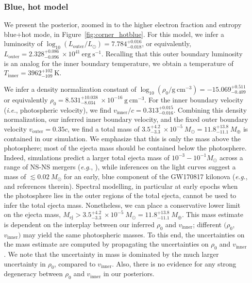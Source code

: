 \documentclass[twocolumn, twocolappendix]{aastex63}
\def\eg{{\it e.g.}}
\def\ie{{\it i.e.}}
\begin{document}
\subsubsection{Blue, hot model}\label{sssc:bluehot}

We present the posterior, zoomed in to the higher electron fraction and entropy blue+hot mode, in Figure~\ref{fig:corner_hotblue}. For this model, we infer a luminosity of $\log_{10}(L_\mathrm{outer}/L_{\odot}) = 7.784^{+0.016}_{-0.018}$, or equivalently, $L_{\mathrm{outer}} = 2.328^{+0.086}_{-0.096}~\times 10^{41}~\mathrm{erg~s^{-1}}$. Recalling that this outer boundary luminosity is an analog for the inner boundary temperature, we obtain a temperature of $T_{\mathrm{inner}} = 3962^{+102}_{-109}~\mathrm{K}$.  

We infer a density normalization constant of $\log_{10} (\rho_0 / \mathrm{g~cm^{-3}}) = -15.069^{+0.511}_{-0.409}$ or equivalently $\rho_0 = 8.531^{+10.038}_{-8.034}~\times 10^{-16}~\mathrm{g~cm^{-3}}$. For the inner boundary velocity (\ie, photospheric velocity), we find $v_{\mathrm{inner}}/c = 0.313^{+0.015}_{-0.016}$. Combining this density normalization, our inferred inner boundary velocity, and the fixed outer boundary velocity $v_{\mathrm{outer}} = 0.35c$, we find a total mass of $ 3.5^{+4.2}_{-3.3}~\times 10^{-5}~M_{\odot} = 11.8^{+13.8}_{-11.1}~M_{\oplus}$ is contained in our simulation. We emphasize that this is only the mass above the photosphere; most of the ejecta mass should be contained below the photosphere. Indeed, simulations predict a larger total ejecta mass of $10^{-3} - 10^{-1} M_{\odot}$ across a range of NS-NS mergers (\eg, \citealt{fernandez16, shibata19}), while inferences on the light curves suggest a mass of $\lesssim 0.02~M_{\odot}$ for an early, blue component of the GW170817 kilonova (\eg, \citealt{villar17} and references therein). Spectral modelling, in particular at early epochs when the photosphere lies in the outer regions of the total ejecta, cannot be used to infer the total ejecta mass. Nonetheless, we can place a conservative lower limit on the ejecta mass, $M_{\mathrm{ej}} > 3.5^{+4.2}_{-3.3}~\times 10^{-5}~M_{\odot} = 11.8^{+13.8}_{-11.1}~M_{\oplus}$. This mass estimate is dependent on the interplay between our inferred $\rho_0$ and $v_{\mathrm{inner}}$; different $(\rho_0$, $v_{\mathrm{inner}})$ may yield the same photospheric masses. To this end, the uncertainties on the mass estimate are computed by propagating the uncertainties on $\rho_0$ and $v_{\mathrm{inner}}$. We note that the uncertainty in mass is dominated by the much larger uncertainty in $\rho_0$, compared to $v_{\mathrm{inner}}$. Also, there is no evidence for any strong degeneracy between $\rho_0$ and $v_{\mathrm{inner}}$ in our posteriors.
\end{document}
